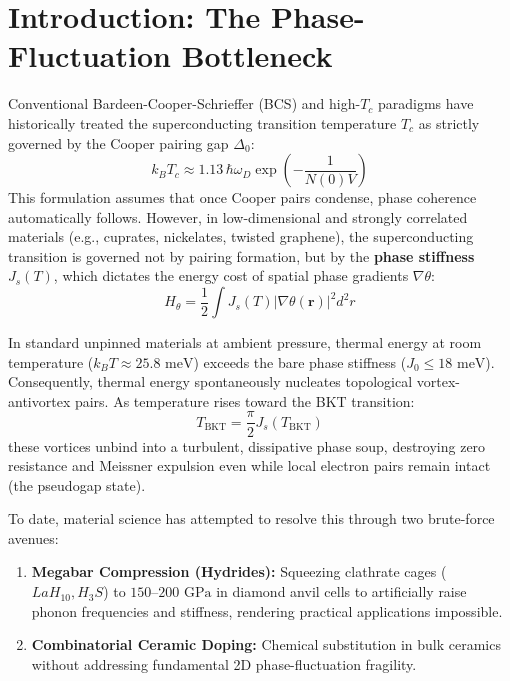 \documentclass[10pt,twocolumn,letterpaper]{article}
\begin{document}
\section{Introduction: The Phase-Fluctuation Bottleneck}

Conventional Bardeen-Cooper-Schrieffer (BCS) and high-$T_c$ paradigms have historically treated the superconducting transition temperature $T_c$ as strictly governed by the Cooper pairing gap $\Delta_0$:
\begin{equation}
k_B T_c \approx 1.13\, \hbar \omega_D \exp\left(-\frac{1}{N(0)V}\right)
\end{equation}
This formulation assumes that once Cooper pairs condense, phase coherence automatically follows. However, in low-dimensional and strongly correlated materials (e.g., cuprates, nickelates, twisted graphene), the superconducting transition is governed not by pairing formation, but by the \textbf{phase stiffness} $J_s(T)$, which dictates the energy cost of spatial phase gradients $\nabla \theta$:
\begin{equation}
H_\theta = \frac{1}{2} \int J_s(T) |\nabla \theta(\mathbf{r})|^2 d^2r
\end{equation}

In standard unpinned materials at ambient pressure, thermal energy at room temperature ($k_B T \approx 25.8\text{ meV}$) exceeds the bare phase stiffness ($J_0 \le 18\text{ meV}$). Consequently, thermal energy spontaneously nucleates topological vortex-antivortex pairs. As temperature rises toward the BKT transition:
\begin{equation}
T_{\text{BKT}} = \frac{\pi}{2} J_s(T_{\text{BKT}})
\end{equation}
these vortices unbind into a turbulent, dissipative phase soup, destroying zero resistance and Meissner expulsion even while local electron pairs remain intact (the pseudogap state).

To date, material science has attempted to resolve this through two brute-force avenues:
\begin{enumerate}
    \item \textbf{Megabar Compression (Hydrides):} Squeezing clathrate cages ($LaH_{10}, H_3S$) to $150\text{--}200\text{ GPa}$ in diamond anvil cells to artificially raise phonon frequencies and stiffness, rendering practical applications impossible.
    \item \textbf{Combinatorial Ceramic Doping:} Chemical substitution in bulk ceramics without addressing fundamental 2D phase-fluctuation fragility.
\end{enumerate}
\end{document}
